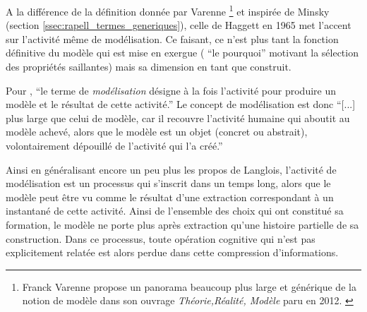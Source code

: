 
A la différence de la définition donnée par Varenne \footnote{Franck Varenne propose un panorama beaucoup plus large et générique de la notion de modèle dans son ouvrage \textit{Théorie,Réalité, Modèle} paru en 2012. \autocite{Varenne2012}} et inspirée de Minsky (section \ref{ssec:rapell_termes_generiques}), celle de Haggett en 1965 met l'accent sur l'activité même de modélisation. Ce faisant, ce n'est plus tant la fonction définitive du modèle qui est mise en exergue ( \enquote{le pourquoi} motivant la sélection des propriétés saillantes) mais sa dimension en tant que construit.


Pour \textcite[36]{Langlois2005}, \enquote{le terme de \textit{modélisation} désigne à la fois l'activité pour produire un modèle et le résultat de cette activité.} Le concept de modélisation est donc \enquote{[...] plus large que celui de modèle, car il recouvre l'activité humaine qui aboutit au modèle achevé, alors que le modèle est un objet (concret ou abstrait), volontairement dépouillé de l'activité qui l'a créé.} 

Ainsi en généralisant encore un peu plus les propos de Langlois, l'activité de modélisation est un processus qui s'inscrit dans un temps long, alors que le modèle peut être vu comme le résultat d'une extraction correspondant à un instantané de cette activité. Ainsi de l'ensemble des choix qui ont constitué sa formation, le modèle ne porte plus après extraction qu'une histoire partielle de sa construction. Dans ce processus, toute opération cognitive qui n'est pas explicitement relatée est alors perdue dans cette compression d'informations.

